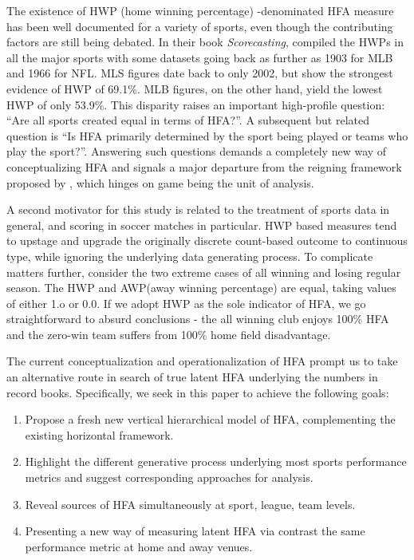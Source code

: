 \documentclass[USenglish]{article}
\begin{document}
The existence of HWP (home winning percentage) -denominated HFA measure has been well documented for a variety of sports, even though the contributing factors are still being debated. In their book \textit{Scorecasting}, \cite{moskowitz2012scorecasting} compiled the HWPs in all the major sports with some datasets going back as further as 1903 for MLB and 1966 for NFL. MLS figures date back to only 2002, but show the strongest evidence of HWP of 69.1\%. MLB figures, on the other hand, yield the lowest HWP of only 53.9\%. This disparity raises an important high-profile question: ``Are all sports created equal in terms of HFA?''. A subsequent but related question is ``Is HFA primarily determined by the sport being played or teams who play the sport?''. Answering such questions demands a completely new way of conceptualizing HFA and signals a major departure from the reigning framework proposed by \cite{Courneya1992}, which hinges on game being the unit of analysis.  
 
A second motivator for this study is related to the treatment of sports data in general, and scoring in soccer matches in particular. HWP based measures tend to upstage and upgrade the originally discrete count-based outcome to continuous type, while ignoring the underlying data generating process. To complicate matters further, consider the two extreme cases of all winning and losing regular season. The HWP and AWP(away winning percentage) are equal, taking values of either 1.o or 0.0. If we adopt HWP as the sole indicator of HFA, we go straightforward to absurd conclusions - the all winning club enjoys 100\% HFA and the zero-win team suffers from 100\% home field disadvantage.   

The current conceptualization and operationalization of HFA prompt us to take an alternative route in search of true latent HFA underlying the numbers in record books. Specifically, we seek in this paper to achieve the following goals: 

\begin{enumerate}
\item  Propose a fresh new vertical hierarchical model of HFA, complementing the existing horizontal framework.
\item Highlight the different generative process underlying most sports performance metrics and suggest corresponding approaches for analysis.
\item Reveal sources of HFA simultaneously at sport, league, team levels.
\item Presenting a new way of measuring latent HFA via contrast the same performance metric at home and away venues. 
\end{enumerate}
\end{document}
